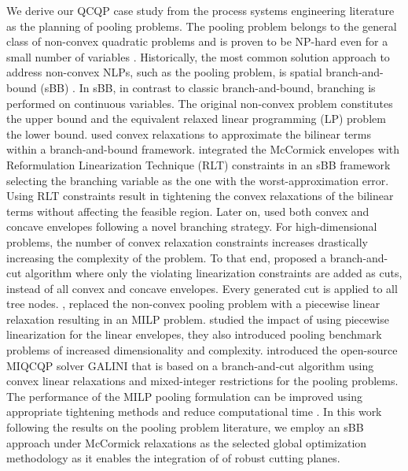 \documentclass[sn-mathphys-num]{sn-jnl}
\begin{document}
We derive our QCQP case study from the process systems engineering literature as the planning of pooling problems. The pooling problem  belongs to the general class of non-convex quadratic problems and is proven to be NP-hard even for a small number of variables \citep{Alfaki2013}. Historically, the most common solution approach to address non-convex NLPs, such as the pooling problem, is spatial branch-and-bound (sBB) \citep{Tuy1998}.  In sBB, in contrast to classic branch-and-bound, branching is performed on continuous variables. The original non-convex problem constitutes the upper bound and the equivalent relaxed linear programming (LP) problem the lower bound. \citet{Foulds1992} used convex relaxations to approximate the bilinear terms within a branch-and-bound framework. \citet{Quesada1995} integrated the McCormick envelopes \citep{McCormick1976} with  Reformulation Linearization Technique (RLT) constraints \citep{Sherali1992} in an sBB framework selecting the branching variable as the one with the worst-approximation error. Using RLT constraints result in tightening the convex relaxations of the bilinear terms without affecting the feasible region.  Later on, \citet{Alfaki2013} used both convex and concave envelopes following a novel branching strategy.  For high-dimensional problems, the number of convex relaxation constraints increases drastically increasing the complexity of the problem. To that end, \citet{Audet2004} proposed a branch-and-cut algorithm where only the violating linearization constraints are added as cuts, instead of all convex and concave envelopes. Every generated cut is applied to all tree nodes. \citet{Gounaris2009}, replaced the non-convex pooling problem  with a piecewise linear relaxation resulting in an MILP problem.  \citet{Dey2015} studied the impact of using piecewise linearization for the linear envelopes, they also introduced pooling benchmark problems of increased dimensionality and complexity. \citet{Ceccon2022} introduced the open-source MIQCQP solver GALINI that is based on a branch-and-cut algorithm using convex linear relaxations and mixed-integer restrictions for the pooling problems. The performance of the MILP pooling formulation can be improved using appropriate tightening methods and reduce computational time \cite{Chen2024}. In this work following the results on the pooling problem literature, we employ an sBB approach under McCormick relaxations as the selected global optimization methodology as it enables the integration of of robust cutting planes.
\end{document}
